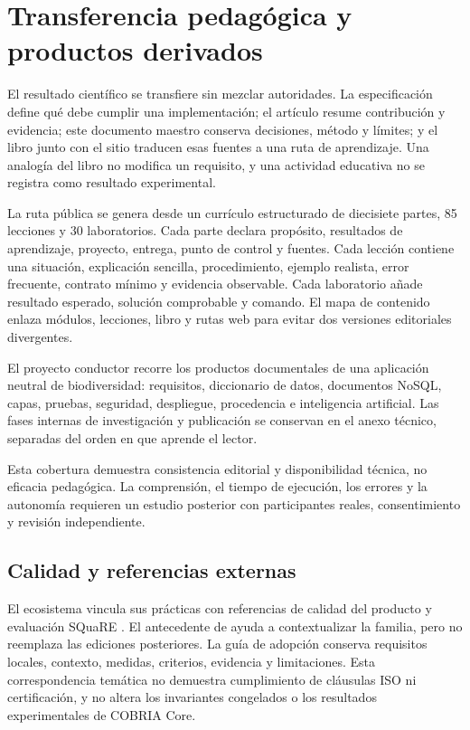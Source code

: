 \chapter{Transferencia pedagógica y productos derivados}

El resultado científico se transfiere sin mezclar autoridades. La especificación define
qué debe cumplir una implementación; el artículo resume contribución y evidencia; este
documento maestro conserva decisiones, método y límites; y el libro junto con el sitio
traducen esas fuentes a una ruta de aprendizaje. Una analogía del libro no modifica un
requisito, y una actividad educativa no se registra como resultado experimental.

La ruta pública se genera desde un currículo estructurado de diecisiete partes, 85
lecciones y 30 laboratorios. Cada parte declara propósito, resultados de aprendizaje,
proyecto, entrega, punto de control y fuentes. Cada lección contiene una situación,
explicación sencilla, procedimiento, ejemplo realista, error frecuente, contrato mínimo
y evidencia observable. Cada laboratorio añade resultado esperado, solución comprobable
y comando. El mapa de contenido enlaza módulos, lecciones, libro y rutas web para evitar
dos versiones editoriales divergentes.

El proyecto conductor recorre los productos documentales de una aplicación neutral de
biodiversidad: requisitos, diccionario de datos, documentos NoSQL, capas, pruebas,
seguridad, despliegue, procedencia e inteligencia artificial. Las fases internas de
investigación y publicación se conservan en el anexo técnico, separadas del orden en que
aprende el lector.

Esta cobertura demuestra consistencia editorial y disponibilidad técnica, no eficacia
pedagógica. La comprensión, el tiempo de ejecución, los errores y la autonomía requieren
un estudio posterior con participantes reales, consentimiento y revisión independiente.

\section{Calidad y referencias externas}

El ecosistema vincula sus prácticas con referencias de calidad del producto y
evaluación SQuaRE \parencite{iso25010_2023,iso25040_2024}. El antecedente de
\textcite{roa2015iso25000} ayuda a contextualizar la familia, pero no reemplaza
las ediciones posteriores. La guía de adopción conserva requisitos locales,
contexto, medidas, criterios, evidencia y limitaciones. Esta correspondencia
temática no demuestra cumplimiento de cláusulas ISO ni certificación, y no altera
los invariantes congelados o los resultados experimentales de COBRIA Core.


